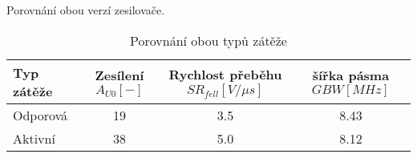 Porovnání obou verzí zesilovače.

\begin{table}[h]
    \centering
    \begin{tabular}{|l|c|c|c|}
        \hline
        \textbf{Typ zátěže} & \textbf{Zesílení \(A_{U0} [-]\)} & \textbf{Rychlost přeběhu  \(SR_{fell} [V/\mu s]\)} & \textbf{šířka pásma \(GBW [MHz]\)} \\ \hline
        Odporová            & 19                               & 3.5                                                & 8.43                               \\ \hline
        Aktivní             & 38                               & 5.0                                                & 8.12                               \\ \hline
    \end{tabular}
    \caption{Porovnání obou typů zátěže}
    \label{tab:zrcadla}
\end{table}